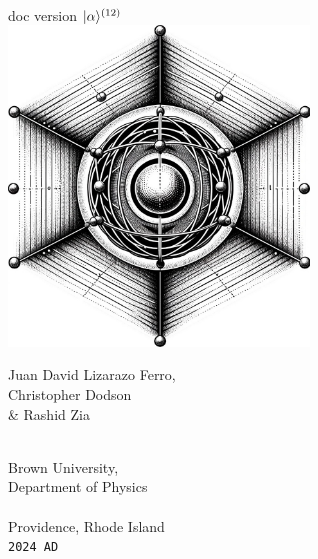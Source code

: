 \documentclass{article}
\newcommand{\codetext}[1]{{\color{BlueViolet} \texttt{#1}}}
\begin{document}
 


\begin{titlepage} %
    \centering
    \vspace*{\fill}
    
    {\Large\qlanth}\\
    {\large doc version $|\alpha\rangle^{(12)}$} \\
    \vspace*{0.5cm}
    \includegraphics[width=0.6\textwidth]{ion_in_lattice.jpg}  %
    \vspace*{0.4cm} %
    
    {\large Juan David Lizarazo Ferro,}\\
    {\large Christopher Dodson}\\
    {\large \& Rashid Zia}\\
    
	\vspace*{\fill}
\end{titlepage}

\newpage

\thispagestyle{empty}
\vspace*{\fill}
\begin{center}
$\,$ \\
{\large Brown University, \\ Department of Physics}\\
\vspace{0.2cm}
\hrulefill \\
\vspace{0.2cm}
Providence, Rhode Island \\
\codetext{2024 AD}
\end{center}
\end{document}
